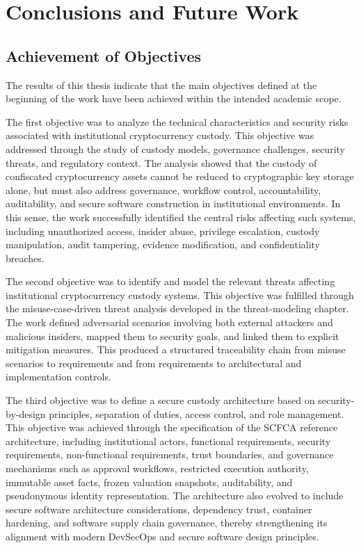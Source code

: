 \documentclass[12pt,a4paper]{report}
\begin{document}
\chapter{Conclusions and Future Work}

\section{Achievement of Objectives}

The results of this thesis indicate that the main objectives defined at the beginning of the work have been achieved within the intended academic scope.

The first objective was to analyze the technical characteristics and security risks associated with institutional cryptocurrency custody. This objective was addressed through the study of custody models, governance challenges, security threats, and regulatory context. The analysis showed that the custody of confiscated cryptocurrency assets cannot be reduced to cryptographic key storage alone, but must also address governance, workflow control, accountability, auditability, and secure software construction in institutional environments. In this sense, the work successfully identified the central risks affecting such systems, including unauthorized access, insider abuse, privilege escalation, custody manipulation, audit tampering, evidence modification, and confidentiality breaches.

The second objective was to identify and model the relevant threats affecting institutional cryptocurrency custody systems. This objective was fulfilled through the misuse-case-driven threat analysis developed in the threat-modeling chapter. The work defined adversarial scenarios involving both external attackers and malicious insiders, mapped them to security goals, and linked them to explicit mitigation measures. This produced a structured traceability chain from misuse scenarios to requirements and from requirements to architectural and implementation controls.

The third objective was to define a secure custody architecture based on security-by-design principles, separation of duties, access control, and role management. This objective was achieved through the specification of the SCFCA reference architecture, including institutional actors, functional requirements, security requirements, non-functional requirements, trust boundaries, and governance mechanisms such as approval workflows, restricted execution authority, immutable asset facts, frozen valuation snapshots, auditability, and pseudonymous identity representation. The architecture also evolved to include secure software architecture considerations, dependency trust, container hardening, and software supply chain governance, thereby strengthening its alignment with modern DevSecOps and secure software design principles.
\end{document}
